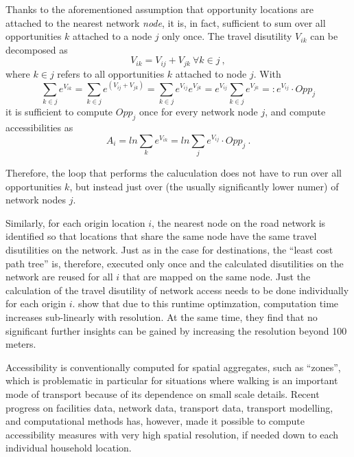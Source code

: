 Thanks to the aforementioned assumption that opportunity locations are attached to the nearest network \textit{node},
it is, in fact, sufficient to sum over all opportunities $k$ attached to a node $j$ only once. The 
travel disutility $V_{ik}$ can be decomposed as
\begin{equation}
V_{ik} = V_{ij} + V_{jk} \ \forall k \in j \ ,
\end{equation}
where $k \in j$ refers to all opportunities $k$ attached to node $j$. With
\begin{equation}
\sum_{k \in j} e^{ V_{ik}} 
%
= \sum_{k \in j} e^{ (V_{ij}+ V_{jk})} 
%
= \sum_{k \in j} e^{ V_{ij}} e^{ V_{jk}} 
%
= e^{ V_{ij}} \sum_{k \in j} e^{ V_{jk}} 
%
=: e^{ V_{ij}} \cdot Opp_j
\end{equation} 
it is sufficient to compute $Opp_j$ once for every network node $j$, and compute accessibilities as
\begin{equation}
A_i = ln \sum_k e^{ V_{ik}}
%
= ln \sum_j e^{ V_{ij}} \cdot Opp_j \ .
\end{equation}

Therefore, the loop that performs the caluculation does not have to run over all opportunities $k$, but instead just 
over (the usually significantly lower numer) of network nodes $j$.

Similarly, for each origin location $i$, the nearest node on the road network is identified so that locations that 
share the same node have the same travel disutilities on the network. Just as in the case for destinations, the 
``least cost path tree'' is, therefore, executed only once and the calculated disutilities on the network are reused 
for all $i$ that are mapped on the same node. Just the calculation of the travel disutility of network access needs
to be done individually for each origin $i$. \citet{NicolaiNagel2012HiResAccessibilityMethodInBook} show that due 
to this runtime optimzation, computation time increases sub-linearly with resolution. At the same time, they find 
that no significant further insights can be gained by increasing the resolution beyond 100\,meters.

Accessibility is conventionally computed for spatial aggregates, such as “zones”, which is problematic in particular 
for situations where walking is an important mode of transport because of its dependence on small scale details. Recent 
progress on facilities data, network data, transport data, transport modelling, and computational methods has, however, 
made it possible to compute accessibility measures with very high spatial resolution, if needed down to each individual 
household location.

